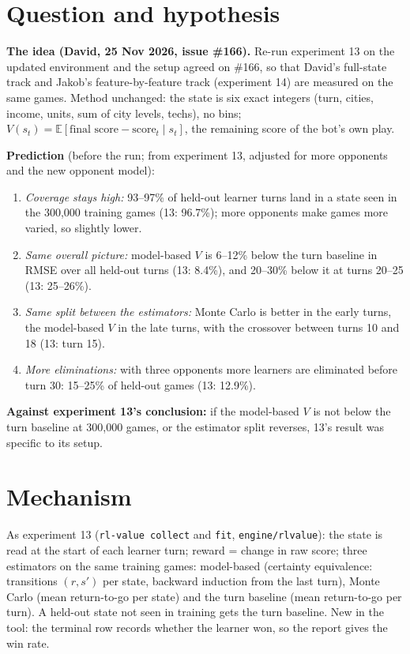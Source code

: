 \documentclass{../polyexp}
\begin{document}

\ExpHeader

\section{Question and hypothesis}
\textbf{The idea (David, 25 Nov 2026, issue \#166).} Re-run experiment 13 on the updated environment and the setup
agreed on \#166, so that David's full-state track and Jakob's feature-by-feature track (experiment 14) are measured
on the same games. Method unchanged: the state is six exact integers (turn, cities, income, units, sum of city
levels, techs), no bins; $V(s_t) = \mathbb{E}[\text{final score} - \text{score}_t \mid s_t]$, the remaining score
of the bot's own play.

\textbf{Prediction} (before the run; from experiment 13, adjusted for more opponents and the new opponent model):
\begin{enumerate}
  \item \emph{Coverage stays high:} 93--97\% of held-out learner turns land in a state seen in the 300{,}000
        training games (13: 96.7\%); more opponents make games more varied, so slightly lower.
  \item \emph{Same overall picture:} model-based $V$ is 6--12\% below the turn baseline in RMSE over all held-out
        turns (13: 8.4\%), and 20--30\% below it at turns 20--25 (13: 25--26\%).
  \item \emph{Same split between the estimators:} Monte Carlo is better in the early turns, the model-based $V$ in
        the late turns, with the crossover between turns 10 and 18 (13: turn 15).
  \item \emph{More eliminations:} with three opponents more learners are eliminated before turn 30: 15--25\% of
        held-out games (13: 12.9\%).
\end{enumerate}
\textbf{Against experiment 13's conclusion:} if the model-based $V$ is not below the turn baseline at 300{,}000
games, or the estimator split reverses, 13's result was specific to its setup.

\section{Mechanism}
As experiment 13 (\texttt{rl-value collect} and \texttt{fit}, \texttt{engine/rlvalue}): the state is read at the start
of each learner turn; reward = change in raw score; three estimators on the same training games: model-based
(certainty equivalence: transitions $(r, s')$ per state, backward induction from the last turn), Monte Carlo
(mean return-to-go per state) and the turn baseline (mean return-to-go per turn). A held-out state not seen in
training gets the turn baseline. New in the tool: the terminal row records whether the learner won, so the report
gives the win rate.
\end{document}
